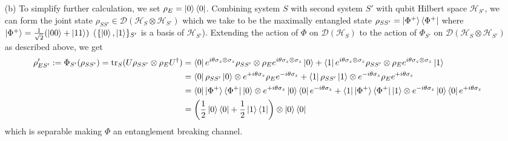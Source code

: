 \documentclass[10pt, a4paper]{article}
\begin{document}
{\begin{enumerate}
  \textcolor{blue}{Precision}: Here, the spectral decomposition $\sigma_z = \ket{0}\bra{0} - \ket{1}\bra{1}$ was used in the same way it is used in part (c). We write $U = e^{i \theta (\ket{0}\bra{0} - \ket{1}\bra{1}) \otimes \sigma_z} = \ket{0}\bra{0} \otimes e^{i\theta \sigma_z} +  \ket{1}\bra{1} \otimes  e^{-i \theta  \sigma_z} $ to simplify the calculation of the trace to  
  \begin{align*}
    \rho_E' &= \bra{0} e^{i \theta \sigma_z \otimes \sigma_z}   \rho_S\otimes\rho_E e^{i \theta \sigma_z \otimes \sigma_z} \ket{0} + \bra{1} e^{i \theta \sigma_z \otimes \sigma_z}   \rho_S\otimes\rho_E e^{i \theta \sigma_z \otimes \sigma_z} \ket{1}\\
    &= \bra{0}  \ket{0}\bra{0} \otimes e^{i\theta \sigma_z}    \rho_S\otimes\rho_E  \ket{0}\bra{0} \otimes e^{i\theta \sigma_z}  \ket{0} + \bra{1} \ket{1}\bra{1} \otimes  e^{-i \theta  \sigma_z} \rho_S\otimes\rho_E \ket{1}\bra{1} \otimes  e^{-i \theta  \sigma_z}  \ket{1}\\
    &= \bra{0}\rho_S \ket{0} \otimes e^{+i \theta \sigma_z} \rho_E e^{-i \theta \sigma_z} +   \bra{1}\rho_S\ket{1} \otimes e^{-i \theta \sigma_z} \rho_E  e^{+i \theta \sigma_z}
  \end{align*}
  
  \item[(b)] To simplify further calculation, we set $\rho_E = \ket{0}\bra{0}$. Combining system $S$  with second system $S'$ with qubit Hilbert space $\mathcal{H}_{S'}$, we can form the joint state $\rho_{SS'} \in \mathcal{D}(\mathcal{H}_S \otimes \mathcal{H}_{S'})$ which we take to be the maximally entangled state $\rho_{SS'} = \ket{\Phi^+}\bra{\Phi^+}$ where $\ket{\Phi^+} = \frac{1}{\sqrt{2}}(\ket{00} + \ket{11})$ ($\{\ket{0}, \ket{1}\}_{S'}$ is a basis of $\mathcal{H}_{S'}$). Extending the action of $\Phi$ on $\mathcal{D}(\mathcal{H}_S)$ to the action of $\Phi_{S'}$ on $\mathcal{D}(\mathcal{H}_S \otimes \mathcal{H}_{S'})$ as described above, we get 
  \begin{align*}
    \rho_{ES'}' := \Phi_{S'}(\rho_{SS'}) = \text{tr}_S (U \rho_{SS'} \otimes\rho_E U^\dagger) &= \bra{0} e^{i \theta \sigma_z \otimes \sigma_z} \rho_{SS'} \otimes\rho_E e^{i \theta \sigma_z \otimes \sigma_z} \ket{0} + \bra{1} e^{i \theta \sigma_z \otimes \sigma_z} \rho_{SS'}\otimes\rho_E e^{i \theta \sigma_z \otimes \sigma_z} \ket{1} \\
    &=   \bra{0}\rho_{SS'} \ket{0} \otimes e^{+i \theta \sigma_z} \rho_E e^{-i \theta \sigma_z} +   \bra{1}\rho_{SS'}\ket{1} \otimes e^{-i \theta \sigma_z} \rho_E  e^{+i \theta \sigma_z}\\
    &=  \bra{0}\ket{\Phi^+}\bra{\Phi^+} \ket{0} \otimes e^{+i \theta \sigma_z} \ket{0}\bra{0} e^{-i \theta \sigma_z} +   \bra{1}\ket{\Phi^+}\bra{\Phi^+}\ket{1} \otimes e^{-i \theta \sigma_z} \ket{0}\bra{0}  e^{+i \theta \sigma_z}\\
    &= \left(\frac{1}{2}\ket{0}\bra{0}  + \frac{1}{2}\ket{1}\bra{1}\right) \otimes \ket{0}\bra{0}
  \end{align*}
  which is separable making $\Phi$ an entanglement breaking channel.


\end{enumerate}}
\end{document}
